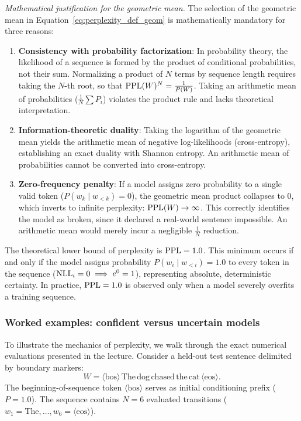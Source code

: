 \documentclass[../../main.tex]{subfiles}
\begin{document}
\textit{Mathematical justification for the geometric mean.} The selection of the geometric mean in Equation~\eqref{eq:perplexity_def_geom} is mathematically mandatory for three reasons:
\begin{enumerate}
    \item \textbf{Consistency with probability factorization}: In probability theory, the likelihood of a sequence is formed by the product of conditional probabilities, not their sum. Normalizing a product of $N$ terms by sequence length requires taking the $N$-th root, so that $\mathrm{PPL}(W)^N = \frac{1}{P(W)}$. Taking an arithmetic mean of probabilities ($\frac{1}{N}\sum P_i$) violates the product rule and lacks theoretical interpretation.
    \item \textbf{Information-theoretic duality}: Taking the logarithm of the geometric mean yields the arithmetic mean of negative log-likelihoods (cross-entropy), establishing an exact duality with Shannon entropy. An arithmetic mean of probabilities cannot be converted into cross-entropy.
    \item \textbf{Zero-frequency penalty}: If a model assigns zero probability to a single valid token ($P(w_k \mid w_{<k}) = 0$), the geometric mean product collapses to 0, which inverts to infinite perplexity: $\mathrm{PPL}(W) \to \infty$. This correctly identifies the model as broken, since it declared a real-world sentence impossible. An arithmetic mean would merely incur a negligible $\frac{1}{N}$ reduction.
\end{enumerate}

The theoretical lower bound of perplexity is $\mathrm{PPL} = 1.0$. This minimum occurs if and only if the model assigns probability $P(w_i \mid w_{<i}) = 1.0$ to every token in the sequence ($\mathrm{NLL}_i = 0 \implies e^0 = 1$), representing absolute, deterministic certainty. In practice, $\mathrm{PPL} = 1.0$ is observed only when a model severely overfits a training sequence.

\subsubsection{Worked examples: confident versus uncertain models}
To illustrate the mechanics of perplexity, we walk through the exact numerical evaluations presented in the lecture. Consider a held-out test sentence delimited by boundary markers:
\begin{equation*}
W = \langle\text{bos}\rangle \, \text{The} \, \text{dog} \, \text{chased} \, \text{the} \, \text{cat} \, \langle\text{eos}\rangle.
\end{equation*}
The beginning-of-sequence token $\langle\text{bos}\rangle$ serves as initial conditioning prefix ($P=1.0$). The sequence contains $N = 6$ evaluated transitions ($w_1 = \text{The}, \dots, w_6 = \langle\text{eos}\rangle$).
\end{document}
